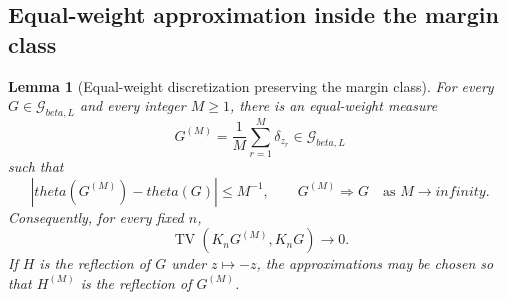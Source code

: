\documentclass[11pt]{article}
\def\beta{beta}%
\def\theta{theta}%
\def\infty{infinity}%
\newtheorem{lemma}[theorem]{Lemma}
\newcommand{\TV}{\operatorname{TV}}
\newcommand{\calG}{\mathcal G}
\begin{document}
\subsection{Equal-weight approximation inside the margin class}

\begin{lemma}[Equal-weight discretization preserving the margin class]
\label{lem:equal-weight-discretization}
For every $G\in\calG_{\beta,L}$ and every integer $M\ge1$, there is an equal-weight measure
\[
G^{(M)}
=
\frac1M\sum_{r=1}^M\delta_{z_r}
\in\calG_{\beta,L}
\]
such that
\[
|\theta(G^{(M)})-\theta(G)|\le M^{-1},
\qquad
G^{(M)}\Rightarrow G
\quad\text{as }M\to\infty.
\]
Consequently, for every fixed $n$,
\[
\TV(K_nG^{(M)},K_nG)\to0.
\]
If $H$ is the reflection of $G$ under $z\mapsto-z$, the approximations may be chosen so that $H^{(M)}$ is the reflection of $G^{(M)}$.
\end{lemma}
\end{document}
